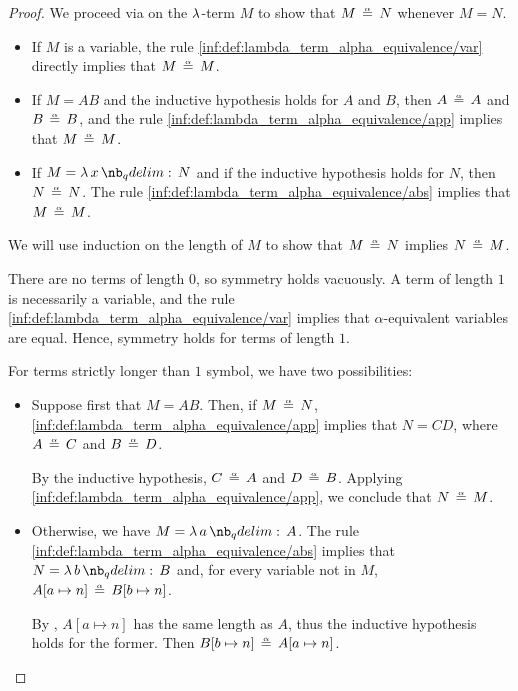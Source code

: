 \begin{proof}

   We proceed via  on the \( \mathrm{\lambda} \)-term \( M \) to show that \( M \aequiv N \) whenever \( M = N \).
  \begin{itemize}
    \item If \( M \) is a variable, the rule \ref{inf:def:lambda_term_alpha_equivalence/var} directly implies that \( M \aequiv M \).
    \item If \( M = AB \) and the inductive hypothesis holds for \( A \) and \( B \), then \( A \aequiv A \) and \( B \aequiv B \), and the rule \ref{inf:def:lambda_term_alpha_equivalence/app} implies that \( M \aequiv M \).
    \item If \( M = \qabs x N \) and if the inductive hypothesis holds for \( N \), then \( N \aequiv N \). The rule \ref{inf:def:lambda_term_alpha_equivalence/abs} implies that \( M \aequiv M \).
  \end{itemize}

   We will use induction on the length of \( M \) to show that \( M \aequiv N \) implies \( N \aequiv M \).

  There are no terms of length \( 0 \), so symmetry holds vacuously. A term of length \( 1 \) is necessarily a variable, and the rule \ref{inf:def:lambda_term_alpha_equivalence/var} implies that \( \alpha \)-equivalent variables are equal. Hence, symmetry holds for terms of length \( 1 \).

  For terms strictly longer than \( 1 \) symbol, we have two possibilities:
  \begin{itemize}
    \item Suppose first that \( M = AB \). Then, if \( M \aequiv N \), \ref{inf:def:lambda_term_alpha_equivalence/app} implies that \( N = CD \), where \( A \aequiv C \) and \( B \aequiv D \).

    By the inductive hypothesis, \( C \aequiv A \) and \( D \aequiv B \). Applying \ref{inf:def:lambda_term_alpha_equivalence/app}, we conclude that \( N \aequiv M \).

    \item Otherwise, we have \( M = \qabs a A \). The rule \ref{inf:def:lambda_term_alpha_equivalence/abs} implies that \( N = \qabs b B \) and, for every variable not in \( M \), \( A[a \mapsto n] \aequiv B[b \mapsto n] \).

    By , \( A[a \mapsto n] \) has the same length as \( A \), thus the inductive hypothesis holds for the former. Then \( B[b \mapsto n] \aequiv A[a \mapsto n] \).


\end{itemize}
\end{proof}
